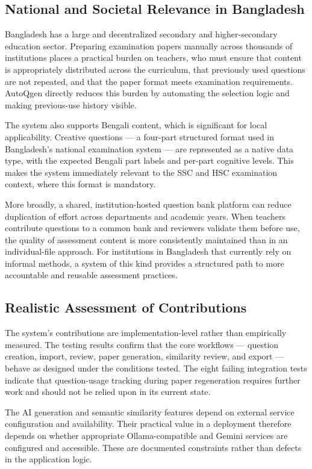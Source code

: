 \subsection{National and Societal Relevance in Bangladesh}

Bangladesh has a large and decentralized secondary and higher-secondary education sector. Preparing examination papers manually across thousands of institutions places a practical burden on teachers, who must ensure that content is appropriately distributed across the curriculum, that previously used questions are not repeated, and that the paper format meets examination requirements. AutoQgen directly reduces this burden by automating the selection logic and making previous-use history visible.

The system also supports Bengali content, which is significant for local applicability. Creative questions — a four-part structured format used in Bangladesh's national examination system — are represented as a native data type, with the expected Bengali part labels and per-part cognitive levels. This makes the system immediately relevant to the SSC and HSC examination context, where this format is mandatory.

More broadly, a shared, institution-hosted question bank platform can reduce duplication of effort across departments and academic years. When teachers contribute questions to a common bank and reviewers validate them before use, the quality of assessment content is more consistently maintained than in an individual-file approach. For institutions in Bangladesh that currently rely on informal methods, a system of this kind provides a structured path to more accountable and reusable assessment practices.

\subsection{Realistic Assessment of Contributions}

The system's contributions are implementation-level rather than empirically measured. The testing results confirm that the core workflows — question creation, import, review, paper generation, similarity review, and export — behave as designed under the conditions tested. The eight failing integration tests indicate that question-usage tracking during paper regeneration requires further work and should not be relied upon in its current state.

The AI generation and semantic similarity features depend on external service configuration and availability. Their practical value in a deployment therefore depends on whether appropriate Ollama-compatible and Gemini services are configured and accessible. These are documented constraints rather than defects in the application logic.

